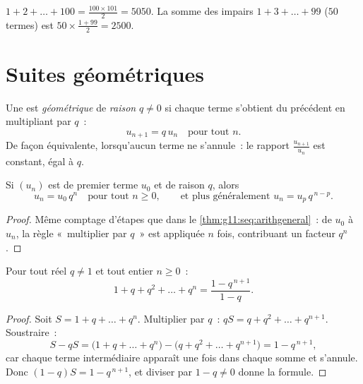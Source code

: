 \begin{example}
$1 + 2 + \dots + 100 = \frac{100 \times 101}{2} = 5050$. La somme des
impairs $1 + 3 + \dots + 99$ ($50$ termes) est
$50 \times \frac{1 + 99}{2} = 2500$.
\end{example}

\section{Suites géométriques}

\begin{definition}\label{def:g11:seq:geometric}
Une  est \emph{géométrique} de
\emph{raison} $q \neq 0$ si chaque terme s'obtient du précédent en
multipliant par $q$~:
\[
u_{n+1} = q\,u_n \quad \text{pour tout } n.
\]
De façon équivalente, lorsqu'aucun terme ne s'annule~: le rapport
$\frac{u_{n+1}}{u_n}$ est constant, égal à $q$.
\end{definition}

\begin{theorem}\label{thm:g11:seq:geomgeneral}
Si $(u_n)$ est  de premier terme $u_0$ et de raison $q$,
alors
\[
u_n = u_0\, q^n \quad \text{pour tout } n \geq 0,
\qquad\text{et plus généralement } u_n = u_p\, q^{\,n-p} .
\]
\end{theorem}

\begin{proof}
Même comptage d'étapes que dans le \cref{thm:g11:seq:arithgeneral}~: de
$u_0$ à $u_n$, la règle «~multiplier par $q$~» est appliquée $n$ fois,
contribuant un facteur $q^n$.
\end{proof}

\begin{theorem}\label{thm:g11:seq:geomsum}
Pour tout réel $q \neq 1$ et tout entier $n \geq 0$~:
\[
1 + q + q^2 + \dots + q^n = \frac{1 - q^{\,n+1}}{1 - q}.
\]
\end{theorem}

\begin{proof}
Soit $S = 1 + q + \dots + q^n$. Multiplier par $q$~:
$qS = q + q^2 + \dots + q^{n+1}$. Soustraire~:
\[
S - qS = \bigl(1 + q + \dots + q^n\bigr)
- \bigl(q + q^2 + \dots + q^{n+1}\bigr) = 1 - q^{\,n+1},
\]
car chaque terme intermédiaire apparaît une fois dans chaque somme et
s'annule. Donc $(1 - q)S = 1 - q^{\,n+1}$, et diviser par $1 - q \neq 0$
donne la formule.
\end{proof}

